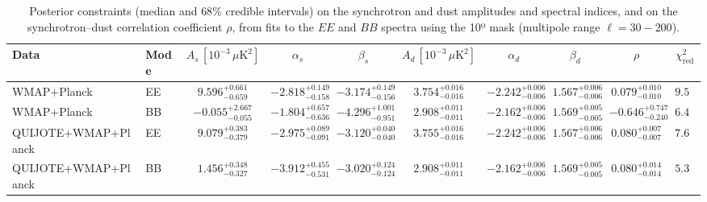 \begin{table}[h]
\centering
\scriptsize
\setlength{\tabcolsep}{4pt}
\caption{Posterior constraints (median and $68\%$ credible intervals) on the synchrotron and dust amplitudes and spectral indices, and on the synchrotron--dust correlation coefficient $\rho$, from fits to the $EE$ and $BB$ spectra using the 10º mask (multipole range $\ell=30-200$).}
\label{tab:fit_results}
\begin{tabular}{llcccccccc}
\toprule
Data & Mode & $A_s\,[10^{-3}\,\mu\mathrm{K}^2]$ & $\alpha_s$ & $\beta_s$ & $A_d\,[10^{-3}\,\mu\mathrm{K}^2]$ & $\alpha_d$ & $\beta_d$ & $\rho$ & $\chi^2_\mathrm{red}$ \\
\midrule
WMAP+Planck & EE & $9.596^{+0.661}_{-0.659}$ & $-2.818^{+0.149}_{-0.158}$ & $-3.174^{+0.149}_{-0.156}$ & $3.754^{+0.016}_{-0.016}$ & $-2.242^{+0.006}_{-0.006}$ & $1.567^{+0.006}_{-0.006}$ & $0.079^{+0.010}_{-0.010}$ & $9.56$ \\
WMAP+Planck & BB & $-0.055^{+2.667}_{-0.055}$ & $-1.804^{+0.657}_{-0.636}$ & $-4.296^{+1.001}_{-0.951}$ & $2.908^{+0.011}_{-0.011}$ & $-2.162^{+0.006}_{-0.006}$ & $1.569^{+0.005}_{-0.005}$ & $-0.646^{+0.747}_{-0.240}$ & $6.41$ \\
QUIJOTE+WMAP+Planck & EE & $9.079^{+0.383}_{-0.379}$ & $-2.975^{+0.089}_{-0.091}$ & $-3.120^{+0.040}_{-0.040}$ & $3.755^{+0.016}_{-0.016}$ & $-2.242^{+0.006}_{-0.006}$ & $1.567^{+0.006}_{-0.006}$ & $0.080^{+0.007}_{-0.007}$ & $7.62$ \\
QUIJOTE+WMAP+Planck & BB & $1.456^{+0.348}_{-0.327}$ & $-3.912^{+0.455}_{-0.531}$ & $-3.020^{+0.124}_{-0.124}$ & $2.908^{+0.011}_{-0.011}$ & $-2.162^{+0.006}_{-0.006}$ & $1.569^{+0.005}_{-0.005}$ & $0.080^{+0.014}_{-0.014}$ & $5.31$ \\
\bottomrule
\end{tabular}
\end{table}
